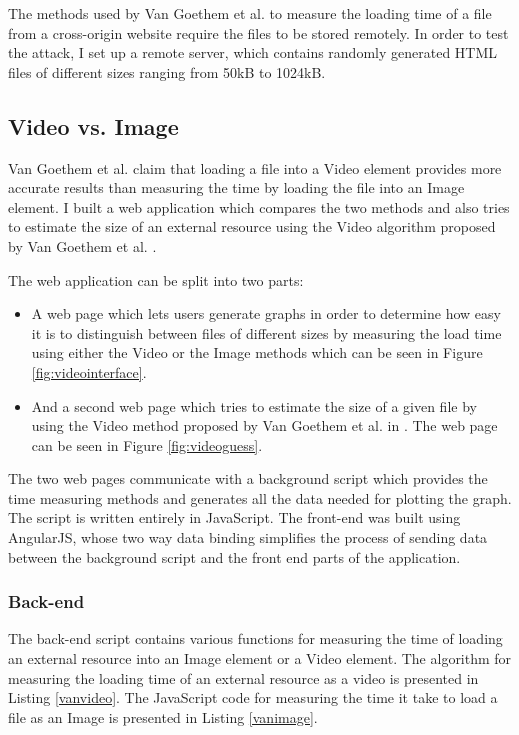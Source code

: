 \documentclass[10pt,a4paper,twoside]{book}
\begin{document}
The methods used by Van Goethem et al. \cite{van2015clock} to measure the loading time of a file from a cross-origin website require the files to be stored remotely. In order to test the attack, I set up a remote server, which contains randomly generated HTML files of different sizes ranging from 50kB to 1024kB. 

\subsection{Video vs. Image}
\label{vvsi}
Van Goethem et al. \cite{van2015clock} claim that loading a file into a Video element provides more accurate results than measuring the time by loading the file into an Image element. I built a web application which compares the two methods and also tries to estimate the size of an external resource using the Video algorithm proposed by Van Goethem et al. \cite{van2015clock}.

The web application can be split into two parts:
\begin{itemize}
\item A web page which lets users generate graphs in order to determine how easy it is to distinguish between files of different sizes by measuring the load time using either the Video or the Image methods which can be seen in Figure \ref{fig:videointerface}.
\item And a second web page which tries to estimate the size of a given file by using the Video method proposed by Van Goethem et al. in \cite{van2015clock}. The web page can be seen in Figure \ref{fig:videoguess}.
\end{itemize}

The two web pages communicate with a background script which provides the time measuring methods and generates all the data needed for plotting the graph. The script is written entirely in JavaScript. The front-end was built using AngularJS, whose two way data binding simplifies the process of sending data between the background script and the front end parts of the application.

\subsubsection{Back-end}

The back-end script contains various functions for measuring the time of loading an external resource into an Image element or a Video element. The algorithm for measuring the loading time of an external resource as a video is presented in Listing \ref{vanvideo}. The JavaScript code for measuring the time it take to load a file as an Image is presented in Listing \ref{vanimage}.
\end{document}
